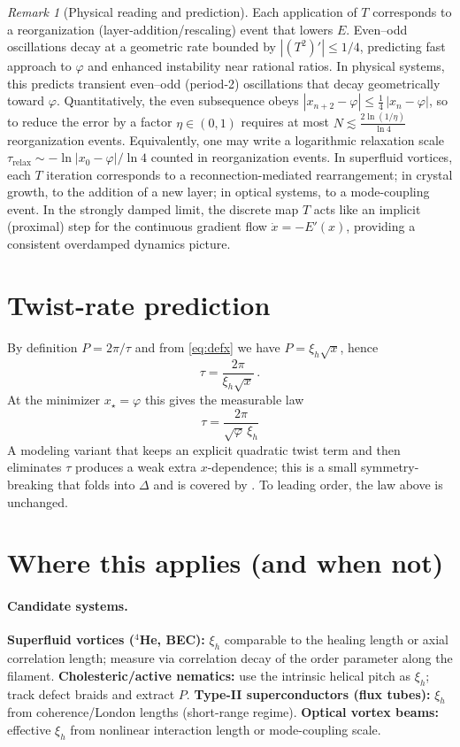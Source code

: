 \documentclass[11pt]{article}
\theoremstyle{remark}
\newtheorem{remark}{Remark}
\theoremstyle{definition}
\newcommand{\ph}{\varphi}
\begin{document}
\begin{remark}[Physical reading and prediction]
Each application of \(T\) corresponds to a reorganization (layer-addition/rescaling) event that lowers \(E\). Even--odd oscillations decay at a geometric rate bounded by \(|(T^2)'|\le 1/4\), predicting fast approach to \(\varphi\) and enhanced instability near rational ratios. In physical systems, this predicts transient even--odd (period-2) oscillations that decay geometrically toward $\varphi$. Quantitatively, the even subsequence obeys $|x_{n+2}-\varphi|\le \tfrac14\,|x_n-\varphi|$, so to reduce the error by a factor $\eta\in(0,1)$ requires at most $N\lesssim\tfrac{2\ln(1/\eta)}{\ln 4}$ reorganization events. Equivalently, one may write a logarithmic relaxation scale $\tau_{\mathrm{relax}}\sim -\ln|x_0-\varphi|/\ln 4$ counted in reorganization events.  In superfluid vortices, each $T$ iteration corresponds to a reconnection-mediated rearrangement; in crystal growth, to the addition of a new layer; in optical systems, to a mode-coupling event.  In the strongly damped limit, the discrete map $T$ acts like an implicit (proximal) step for the continuous gradient flow $\dot x=-E'(x)$, providing a consistent overdamped dynamics picture.\end{remark}

\section{Twist-rate prediction}
By definition $P=2\pi/\tau$ and from \eqref{eq:defx} we have $P=\xi_h\sqrt{x}$, hence
\begin{equation}
 \tau=\frac{2\pi}{\xi_h\sqrt{x}}\,.
\end{equation}
At the minimizer $x_\star=\ph$ this gives the measurable law
\begin{equation}
 \boxed{\;\tau=\dfrac{2\pi}{\sqrt{\ph}\,\xi_h}\;}
\end{equation}
A modeling variant that keeps an explicit quadratic twist term and then eliminates $\tau$ produces a weak extra $x$-dependence; this is a small symmetry-breaking that folds into $\Delta$ and is covered by . To leading order, the law above is unchanged.

\section{Where this applies (and when not)}
\paragraph{Candidate systems.} \textbf{Superfluid vortices (\(^{4}\)He, BEC):} $\xi_h$ comparable to the healing length or axial correlation length; measure via correlation decay of the order parameter along the filament. \textbf{Cholesteric/active nematics:} use the intrinsic helical pitch as $\xi_h$; track defect braids and extract $P$. \textbf{Type-II superconductors (flux tubes):} $\xi_h$ from coherence/London lengths (short-range regime). \textbf{Optical vortex beams:} effective $\xi_h$ from nonlinear interaction length or mode-coupling scale.
\end{document}
